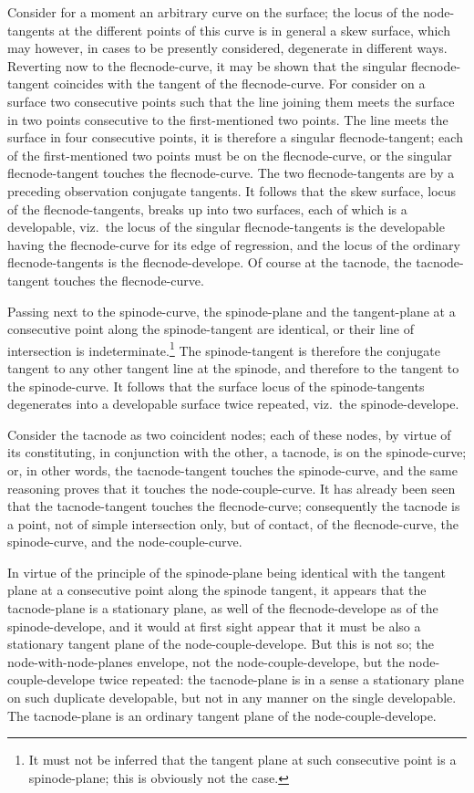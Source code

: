 \documentclass[11pt,a4paper]{book}
\begin{document}
Consider for a moment an arbitrary curve on the surface; the locus of the node-tangents at the different points of this curve is in general a skew surface, which may however, in cases to be presently considered, degenerate in different ways. Reverting now to the flecnode-curve, it may be shown that the singular flecnode-tangent coincides with the tangent of the flecnode-curve. For consider on a surface two consecutive points such that the line joining them meets the surface in two points consecutive to the first-mentioned two points. The line meets the surface in four consecutive points, it is therefore a singular flecnode-tangent; each of the first-mentioned two points must be on the flecnode-curve, or the singular flecnode-tangent touches the flecnode-curve. The two flecnode-tangents are by a preceding observation conjugate tangents. It follows that the skew surface, locus of the flecnode-tangents, breaks up into two surfaces, each of which is a developable, viz.\ the locus of the singular flecnode-tangents is the developable having the flecnode-curve for its edge of regression, and the locus of the ordinary flecnode-tangents is the flecnode-develope. Of course at the tacnode, the tacnode-tangent touches the flecnode-curve.

Passing next to the spinode-curve, the spinode-plane and the tangent-plane at a consecutive point along the spinode-tangent are identical, or their line of intersection is indeterminate.\footnote{It must not be inferred that the tangent plane at such consecutive point is a spinode-plane; this is obviously not the case.} The spinode-tangent is therefore the conjugate tangent to any other tangent line at the spinode, and therefore to the tangent to the spinode-curve. It follows that the surface locus of the spinode-tangents degenerates into a developable surface twice repeated, viz.\ the spinode-develope.

Consider the tacnode as two coincident nodes; each of these nodes, by virtue of its constituting, in conjunction with the other, a tacnode, is on the spinode-curve; or, in other words, the tacnode-tangent touches the spinode-curve, and the same reasoning proves that it touches the node-couple-curve. It has already been seen that the tacnode-tangent touches the flecnode-curve; consequently the tacnode is a point, not of simple intersection only, but of contact, of the flecnode-curve, the spinode-curve, and the node-couple-curve.

In virtue of the principle of the spinode-plane being identical with the tangent plane at a consecutive point along the spinode tangent, it appears that the tacnode-plane is a stationary plane, as well of the flecnode-develope as of the spinode-develope, and it would at first sight appear that it must be also a stationary tangent plane of the node-couple-develope. But this is not so; the node-with-node-planes envelope, not the node-couple-develope, but the node-couple-develope twice repeated: the tacnode-plane is in a sense a stationary plane on such duplicate developable, but not in any manner on the single developable. The tacnode-plane is an ordinary tangent plane of the node-couple-develope.
\end{document}
